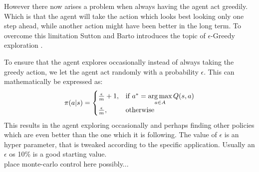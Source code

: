 However there now arises a problem when always having the agent act greedily. Which is that the agent will take the action which looks best looking only one step ahead, while another action might have been better in the long term. To overcome this limitation Sutton and Barto introduces the topic of $\epsilon$-Greedy exploration \cite{sutton_barto}.

To ensure that the agent explores occasionally instead of always taking the greedy action, we let the agent act randomly with a probability $\epsilon$. This can mathematically be expressed as:
\begin{align}
	\pi(a|s)=\begin{cases}
		\frac{\epsilon}{m}+1, & \text{if $a^* = \operatorname*{arg\,max}\limits_{a \in A}Q (s,a)$}\\
		\frac{\epsilon}{m}, & \text{otherwise}
	\end{cases}
	\label{eq:pi_epsilon-greedy}
\end{align}
This results in the agent exploring occasionally and perhaps finding other policies which are even better than the one which it is following. The value of $\epsilon$ is an hyper parameter, that is tweaked according to the specific application. Usually an $\epsilon$ os 10\% is a good starting value.
\\
{\color{red} \huge place monte-carlo control here possibly...}
